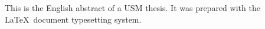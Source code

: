 \begin{EnAbstract}
This is the English abstract of a USM thesis.  It was prepared with the \LaTeX\ document typesetting system.
\end{EnAbstract}